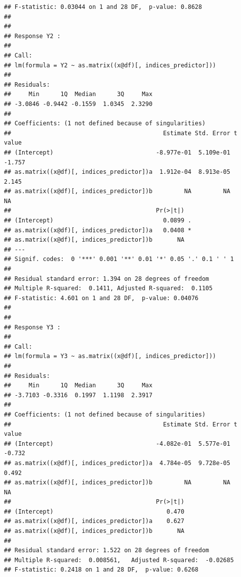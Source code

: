 \documentclass{article}\usepackage[]{graphicx}\usepackage[]{color}
\makeatletter
\newenvironment{kframe}{%
 \def\at@end@of@kframe{}%
 \ifinner\ifhmode%
  \def\at@end@of@kframe{\end{minipage}}%
  \begin{minipage}{\columnwidth}%
 \fi\fi%
 \def\FrameCommand##1{\hskip\@totalleftmargin \hskip-\fboxsep
 \colorbox{shadecolor}{##1}\hskip-\fboxsep
     \hskip-\linewidth \hskip-\@totalleftmargin \hskip\columnwidth}%
 \MakeFramed {\advance\hsize-\width
   \@totalleftmargin\z@ \linewidth\hsize
   \@setminipage}}%
 {\par\unskip\endMakeFramed%
 \at@end@of@kframe}
\newenvironment{knitrout}{}{} %
\makeatother
\begin{document}
\begin{knitrout}
\begin{kframe}
\begin{verbatim}
## F-statistic: 0.03044 on 1 and 28 DF,  p-value: 0.8628
## 
## 
## Response Y2 :
## 
## Call:
## lm(formula = Y2 ~ as.matrix((x@df)[, indices_predictor]))
## 
## Residuals:
##     Min      1Q  Median      3Q     Max 
## -3.0846 -0.9442 -0.1559  1.0345  2.3290 
## 
## Coefficients: (1 not defined because of singularities)
##                                           Estimate Std. Error t value
## (Intercept)                             -8.977e-01  5.109e-01  -1.757
## as.matrix((x@df)[, indices_predictor])a  1.912e-04  8.913e-05   2.145
## as.matrix((x@df)[, indices_predictor])b         NA         NA      NA
##                                         Pr(>|t|)  
## (Intercept)                               0.0899 .
## as.matrix((x@df)[, indices_predictor])a   0.0408 *
## as.matrix((x@df)[, indices_predictor])b       NA  
## ---
## Signif. codes:  0 '***' 0.001 '**' 0.01 '*' 0.05 '.' 0.1 ' ' 1
## 
## Residual standard error: 1.394 on 28 degrees of freedom
## Multiple R-squared:  0.1411,	Adjusted R-squared:  0.1105 
## F-statistic: 4.601 on 1 and 28 DF,  p-value: 0.04076
## 
## 
## Response Y3 :
## 
## Call:
## lm(formula = Y3 ~ as.matrix((x@df)[, indices_predictor]))
## 
## Residuals:
##     Min      1Q  Median      3Q     Max 
## -3.7103 -0.3316  0.1997  1.1198  2.3917 
## 
## Coefficients: (1 not defined because of singularities)
##                                           Estimate Std. Error t value
## (Intercept)                             -4.082e-01  5.577e-01  -0.732
## as.matrix((x@df)[, indices_predictor])a  4.784e-05  9.728e-05   0.492
## as.matrix((x@df)[, indices_predictor])b         NA         NA      NA
##                                         Pr(>|t|)
## (Intercept)                                0.470
## as.matrix((x@df)[, indices_predictor])a    0.627
## as.matrix((x@df)[, indices_predictor])b       NA
## 
## Residual standard error: 1.522 on 28 degrees of freedom
## Multiple R-squared:  0.008561,	Adjusted R-squared:  -0.02685 
## F-statistic: 0.2418 on 1 and 28 DF,  p-value: 0.6268
\end{verbatim}
\end{kframe}
\end{knitrout}
\end{document}
